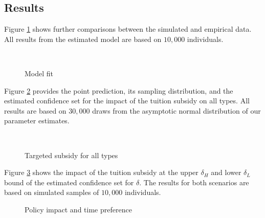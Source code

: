\subsection{Results}\label{Appendix results}\FloatBarrier
Figure \ref{Model fit appendix} shows further comparisons between the simulated and empirical data. All results from the estimated model are based on $10,000$ individuals.

\begin{figure}[h]\centering
	 \\
	\caption{Model fit}\label{Model fit appendix}
\end{figure}\FloatBarrier

\noindent Figure \ref{Targeted subsidy for all types} provides the point prediction, its sampling distribution, and the estimated confidence set for the impact of the tuition subsidy on all types. All results are based on $30,000$ draws from the asymptotic normal distribution of our parameter estimates.

\begin{figure}[h!]\centering
  \\
  \caption{Targeted subsidy for all types}\label{Targeted subsidy for all types}
\end{figure}\FloatBarrier

\noindent Figure \ref{Policy impact and time preference} shows the impact of the tuition subsidy at the upper $\delta_H$ and lower $\delta_L$ bound of the estimated confidence set for $\delta$. The results for both scenarios are based on simulated samples of $10,000$ individuals.

\begin{figure}[h!]\centering
{}
\caption{Policy impact and time preference}\label{Policy impact and time preference}
\end{figure}\FloatBarrier
